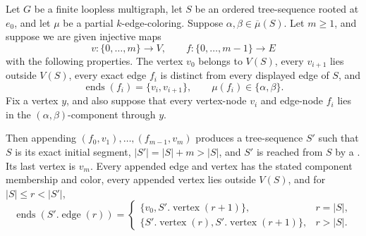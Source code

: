 \begin{helper}
Let \(G\) be a finite loopless multigraph, let \(S\) be an ordered
tree-sequence rooted at \(e_0\), and let \(\mu\) be a partial
\(k\)-edge-coloring.  Suppose \(\alpha,\beta\in\overline\mu(S)\).
Let \(m\geq1\), and suppose we are given injective maps
\[
 v:\{0,\ldots,m\}\longrightarrow V,
 \qquad f:\{0,\ldots,m-1\}\longrightarrow E
\]
with the following properties.  The vertex \(v_0\) belongs to \(V(S)\),
every \(v_{i+1}\) lies outside \(V(S)\), every exact edge \(f_i\) is
distinct from every displayed edge of \(S\), and
\[
 \operatorname{ends}(f_i)=\{v_i,v_{i+1}\},\qquad
 \mu(f_i)\in\{\alpha,\beta\}.                              \tag{1}
\]
Fix a vertex \(y\), and also suppose that every vertex-node \(v_i\) and
edge-node \(f_i\) lies in the \((\alpha,\beta)\)-component through \(y\).

Then appending
\((f_0,v_1),\ldots,(f_{m-1},v_m)\) produces a tree-sequence \(S'\) such
that \(S\) is its exact initial segment,
\(|S'|=|S|+m>|S|\), and \(S'\) is reached from \(S\) by a
.  Its last vertex is \(v_m\).
Every appended edge and vertex has the stated component membership and
color, every appended vertex lies outside \(V(S)\), and for
\(|S|\leq r<|S'|\),
\[
 \operatorname{ends}(S'.\operatorname{edge}(r))=
 \begin{cases}
  \{v_0,S'.\operatorname{vertex}(r+1)\},&r=|S|,\\
  \{S'.\operatorname{vertex}(r),S'.\operatorname{vertex}(r+1)\},&r>|S|.
 \end{cases}                                                \tag{2}
\]
\end{helper}
